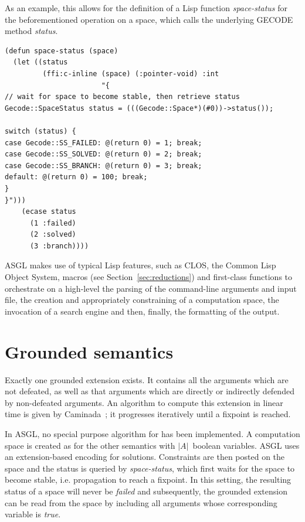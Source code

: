 \documentclass[runningheads,a4paper]{llncs}
\begin{document}
As an example, this allows for the definition of a Lisp function
\textit{space-status} for the beforementioned operation on a space,
which calls the underlying GECODE method \textit{status}.

\begin{scriptsize}
\begin{verbatim}
(defun space-status (space)
  (let ((status
         (ffi:c-inline (space) (:pointer-void) :int
                       "{
// wait for space to become stable, then retrieve status
Gecode::SpaceStatus status = (((Gecode::Space*)(#0))->status());

switch (status) {
case Gecode::SS_FAILED: @(return 0) = 1; break;
case Gecode::SS_SOLVED: @(return 0) = 2; break;
case Gecode::SS_BRANCH: @(return 0) = 3; break;
default: @(return 0) = 100; break;
}
}")))
    (ecase status
      (1 :failed)
      (2 :solved)
      (3 :branch))))
\end{verbatim}
\end{scriptsize}

ASGL makes use of typical Lisp features, such as CLOS, the Common Lisp
Object System, macros (see Section~\ref{sec:reductions}) and
first-class functions to orchestrate on a high-level the parsing of
the command-line arguments and input file, the creation and
appropriately constraining of a computation space, the invocation of a
search engine and then, finally, the formatting of the output.

\section{Grounded semantics}\label{sec:grounded}

Exactly one grounded extension exists. It contains all the arguments
which are not defeated, as well as that arguments which are directly
or indirectly defended by non-defeated arguments. An algorithm to
compute this extension in linear time is given by
Caminada~\cite{Modgil2009}; it progresses iteratively until a fixpoint
is reached.

In ASGL, no special purpose algorithm for \grsem{} has been
implemented. A computation space is created as for the other semantics
with $|A|$~boolean variables. ASGL uses an extension-based encoding
for solutions. Constraints are then posted on the space and the status
is queried by \textit{space-status}, which first waits for the space
to become stable, i.e. propagation to reach a fixpoint. In this
setting, the resulting status of a space will never be \textit{failed}
and subsequently, the grounded extension can be read from the space by
including all arguments whose corresponding variable is \textit{true}.
\end{document}
